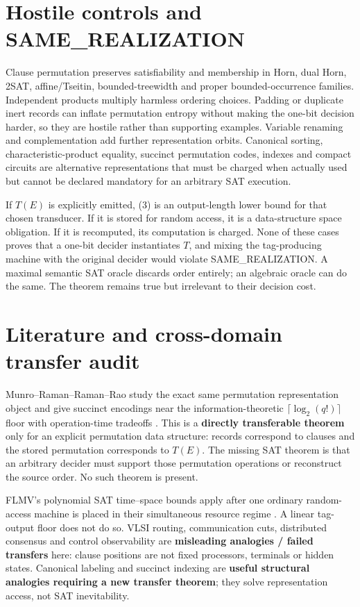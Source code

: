 \documentclass[11pt]{article}
\begin{document}
\section{Hostile controls and SAME\_REALIZATION}

Clause permutation preserves satisfiability and membership in Horn, dual
Horn, 2SAT, affine/Tseitin, bounded-treewidth and proper bounded-occurrence
families.  Independent products multiply harmless ordering choices.  Padding
or duplicate inert records can inflate permutation entropy without making the
one-bit decision harder, so they are hostile rather than supporting examples.
Variable renaming and complementation add further representation orbits.
Canonical sorting, characteristic-product equality, succinct permutation
codes, indexes and compact circuits are alternative representations that
must be charged when actually used but cannot be declared mandatory for an
arbitrary SAT execution.

If $T(E)$ is explicitly emitted, (3) is an output-length lower bound for that
chosen transducer.  If it is stored for random access, it is a data-structure
space obligation.  If it is recomputed, its computation is charged.  None of
these cases proves that a one-bit decider instantiates $T$, and mixing the
tag-producing machine with the original decider would violate
SAME\_REALIZATION.  A maximal semantic SAT oracle discards order entirely;
an algebraic oracle can do the same.  The theorem remains true but irrelevant
to their decision cost.

\section{Literature and cross-domain transfer audit}

Munro--Raman--Raman--Rao study the exact same permutation representation
object and give succinct encodings near the information-theoretic
$\lceil\log_2(q!)\rceil$ floor with operation-time tradeoffs
\cite{MRRR12}.  This is a \textbf{directly transferable theorem} only for an
explicit permutation data structure: records correspond to clauses and the
stored permutation corresponds to $T(E)$.  The missing SAT theorem is that an
arbitrary decider must support those permutation operations or reconstruct
the source order.  No such theorem is present.

FLMV's polynomial SAT time--space bounds apply after one ordinary random-
access machine is placed in their simultaneous resource regime
\cite{FLMV05}.  A linear tag-output floor does not do so.  VLSI routing,
communication cuts, distributed consensus and control observability are
\textbf{misleading analogies / failed transfers} here: clause positions are
not fixed processors, terminals or hidden states.  Canonical labeling and
succinct indexing are \textbf{useful structural analogies requiring a new
transfer theorem}; they solve representation access, not SAT inevitability.
\end{document}
